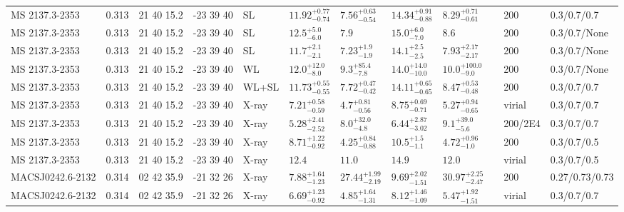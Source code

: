\begin{landscape}
\begin{center}
{\begin{longtable}{llllllllllll}
MS 2137.3-2353 & 0.313 & 21 40 15.2 & -23 39 40 & SL & ${11.92}^{+0.77}_{-0.74}$ & ${7.56}^{+0.63}_{-0.54}$ & ${14.34}^{+0.91}_{-0.88}$ & ${8.29}^{+0.71}_{-0.61}$ & \citet{GA05.2} & 200 & 0.3/0.7/0.7 \\
MS 2137.3-2353 & 0.313 & 21 40 15.2 & -23 39 40 & SL & ${12.5}^{+5.0}_{-6.0}$ & ${7.9}^{}_{}$ & ${15.0}^{+6.0}_{-7.0}$ & ${8.6}^{}_{}$ & \citet{GA03.1} & 200 & 0.3/0.7/None \\
MS 2137.3-2353 & 0.313 & 21 40 15.2 & -23 39 40 & SL & ${11.7}^{+2.1}_{-2.1}$ & ${7.23}^{+1.9}_{-1.9}$ & ${14.1}^{+2.5}_{-2.5}$ & ${7.93}^{+2.17}_{-2.17}$ & \citet{GA02.2} & 200 & 0.3/0.7/None \\
MS 2137.3-2353 & 0.313 & 21 40 15.2 & -23 39 40 & WL & ${12.0}^{+12.0}_{-8.0}$ & ${9.3}^{+85.4}_{-7.8}$ & ${14.0}^{+14.0}_{-10.0}$ & ${10.0}^{+100.0}_{-9.0}$ & \citet{GA03.1} & 200 & 0.3/0.7/None \\
MS 2137.3-2353 & 0.313 & 21 40 15.2 & -23 39 40 & WL+SL & ${11.73}^{+0.55}_{-0.55}$ & ${7.72}^{+0.47}_{-0.42}$ & ${14.11}^{+0.65}_{-0.65}$ & ${8.47}^{+0.53}_{-0.48}$ & \citet{GA05.2} & 200 & 0.3/0.7/0.7 \\
MS 2137.3-2353 & 0.313 & 21 40 15.2 & -23 39 40 & X-ray & ${7.21}^{+0.58}_{-0.59}$ & ${4.7}^{+0.81}_{-0.56}$ & ${8.75}^{+0.69}_{-0.71}$ & ${5.27}^{+0.94}_{-0.65}$ & \citet{SC07.1} & virial & 0.3/0.7/0.7 \\
MS 2137.3-2353 & 0.313 & 21 40 15.2 & -23 39 40 & X-ray & ${5.28}^{+2.41}_{-2.52}$ & ${8.0}^{+32.0}_{-4.8}$ & ${6.44}^{+2.87}_{-3.02}$ & ${9.1}^{+39.0}_{-5.6}$ & \citet{VO06.1} & 200/2E4 & 0.3/0.7/0.7 \\
MS 2137.3-2353 & 0.313 & 21 40 15.2 & -23 39 40 & X-ray & ${8.71}^{+1.22}_{-0.92}$ & ${4.25}^{+0.84}_{-0.88}$ & ${10.5}^{+1.5}_{-1.1}$ & ${4.72}^{+0.96}_{-1.0}$ & \citet{AL03.1} & 200 & 0.3/0.7/0.5 \\
MS 2137.3-2353 & 0.313 & 21 40 15.2 & -23 39 40 & X-ray & ${12.4}^{}_{}$ & ${11.0}^{}_{}$ & ${14.9}^{}_{}$ & ${12.0}^{}_{}$ & \citet{MO99.1} & virial & 0.3/0.7/0.5 \\
MACSJ0242.6-2132 & 0.314 & 02 42 35.9 & -21 32 26 & X-ray & ${7.88}^{+1.64}_{-1.23}$ & ${27.44}^{+1.99}_{-2.19}$ & ${9.69}^{+2.02}_{-1.51}$ & ${30.97}^{+2.25}_{-2.47}$ & \citet{BA14.1} & 200 & 0.27/0.73/0.73 \\
MACSJ0242.6-2132 & 0.314 & 02 42 35.9 & -21 32 26 & X-ray & ${6.69}^{+1.23}_{-0.92}$ & ${4.85}^{+1.64}_{-1.31}$ & ${8.12}^{+1.46}_{-1.09}$ & ${5.47}^{+1.92}_{-1.51}$ & \citet{SC07.1} & virial & 0.3/0.7/0.7 \\

\end{longtable}}
\end{center}
\end{landscape}
